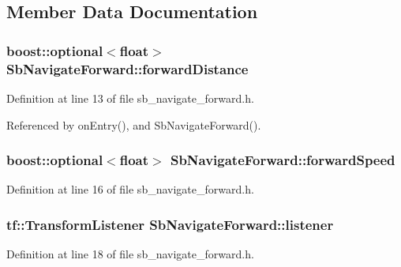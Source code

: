\subsection{Member Data Documentation}
\subsubsection[{\texorpdfstring{forward\+Distance}{forwardDistance}}]{\setlength{\rightskip}{0pt plus 5cm}boost\+::optional$<$float$>$ Sb\+Navigate\+Forward\+::forward\+Distance}\hypertarget{classSbNavigateForward_adc99629f937c3d43fa56a59ca16f9aee}{}\label{classSbNavigateForward_adc99629f937c3d43fa56a59ca16f9aee}


Definition at line 13 of file sb\+\_\+navigate\+\_\+forward.\+h.



Referenced by on\+Entry(), and Sb\+Navigate\+Forward().

\subsubsection[{\texorpdfstring{forward\+Speed}{forwardSpeed}}]{\setlength{\rightskip}{0pt plus 5cm}boost\+::optional$<$float$>$ Sb\+Navigate\+Forward\+::forward\+Speed}\hypertarget{classSbNavigateForward_a181f05b260365f933965d575a3affdf1}{}\label{classSbNavigateForward_a181f05b260365f933965d575a3affdf1}


Definition at line 16 of file sb\+\_\+navigate\+\_\+forward.\+h.

\subsubsection[{\texorpdfstring{listener}{listener}}]{\setlength{\rightskip}{0pt plus 5cm}tf\+::\+Transform\+Listener Sb\+Navigate\+Forward\+::listener}\hypertarget{classSbNavigateForward_acdf8c63e8a81587ef0b419c94e3b6a4d}{}\label{classSbNavigateForward_acdf8c63e8a81587ef0b419c94e3b6a4d}


Definition at line 18 of file sb\+\_\+navigate\+\_\+forward.\+h.

